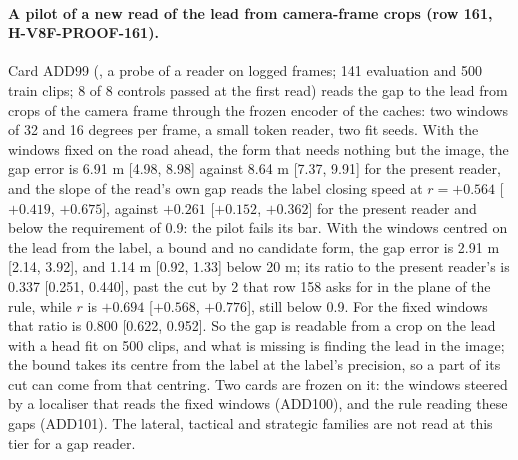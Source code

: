 \paragraph{A pilot of a new read of the lead from camera-frame crops (row 161, H-V8F-PROOF-161).} Card ADD99 (, a probe of a reader on logged frames; 141 evaluation and 500 train clips; 8 of 8 controls passed at the first read) reads the gap to the lead from crops of the camera frame through the frozen encoder of the caches: two windows of 32 and 16 degrees per frame, a small token reader, two fit seeds. With the windows fixed on the road ahead, the form that needs nothing but the image, the gap error is 6.91 m [4.98, 8.98] against 8.64 m [7.37, 9.91] for the present reader, and the slope of the read's own gap reads the label closing speed at $r = +0.564$ [$+0.419$, $+0.675$], against $+0.261$ [$+0.152$, $+0.362$] for the present reader and below the requirement of 0.9: the pilot fails its bar. With the windows centred on the lead from the label, a bound and no candidate form, the gap error is 2.91 m [2.14, 3.92], and 1.14 m [0.92, 1.33] below 20 m; its ratio to the present reader's is 0.337 [0.251, 0.440], past the cut by 2 that row 158 asks for in the plane of the rule, while $r$ is $+0.694$ [$+0.568$, $+0.776$], still below 0.9. For the fixed windows that ratio is 0.800 [0.622, 0.952]. So the gap is readable from a crop on the lead with a head fit on 500 clips, and what is missing is finding the lead in the image; the bound takes its centre from the label at the label's precision, so a part of its cut can come from that centring. Two cards are frozen on it: the windows steered by a localiser that reads the fixed windows (ADD100), and the rule reading these gaps (ADD101). The lateral, tactical and strategic families are not read at this tier for a gap reader.

